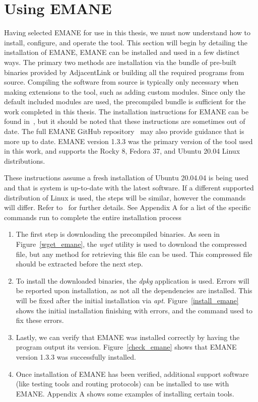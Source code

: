 \section{Using EMANE}
Having selected EMANE for use in this thesis, we must now understand how to install, configure, and operate the tool.
This section will begin by detailing the installation of EMANE, 
EMANE can be installed and used in a few distinct ways.
The primary two methods are installation via the bundle of pre-built binaries provided by AdjacentLink or building all the required programs from source.
Compiling the software from source is typically only necessary when making extensions to the tool, such as adding custom modules.
Since only the default included modules are used, the precompiled bundle is sufficient for the work completed in this thesis.
The installation instructions for EMANE can be found in~\cite{emane_tutorial}, but it should be noted that these instructions are sometimes out of date.
The full EMANE GitHub repository~\cite{emane_git} may also provide guidance that is more up to date.
EMANE version 1.3.3 was the primary version of the tool used in this work, and supports the Rocky 8, Fedora 37, and Ubuntu 20.04 Linux distributions. \par
These instructions assume a fresh installation of Ubuntu 20.04.04 is being used and that is system is up-to-date with the latest software.
If a different supported distribution of Linux is used, the steps will be similar, however the commands will differ. Refer to~\cite{emane_tutorial,emane_git} for further details.
See Appendix A for a list of the specific commands run to complete the entire installation process %
\begin{enumerate}
    \item The first step is downloading the precompiled binaries. As seen in Figure~\ref{wget_emane}, the \textit{wget} utility is used to download the compressed file, but any method for retrieving this file can be used. This compressed file should be extracted before the next step.
    \item To install the downloaded binaries, the \textit{dpkg} application is used. Errors will be reported upon installation, as not all the dependencies are installed. This will be fixed after the initial installation via \textit{apt}. Figure~\ref{install_emane} shows the initial installation finishing with errors, and the command used to fix these errors.
    \item Lastly, we can verify that EMANE was installed correctly by having the program output its version. Figure~\ref{check_emane} shows that EMANE version 1.3.3 was successfully installed.
    \item Once installation of EMANE has been verified, additional support software (like testing tools and routing protocols) can be installed to use with EMANE. Appendix A shows some examples of installing certain tools. %
\end{enumerate}

